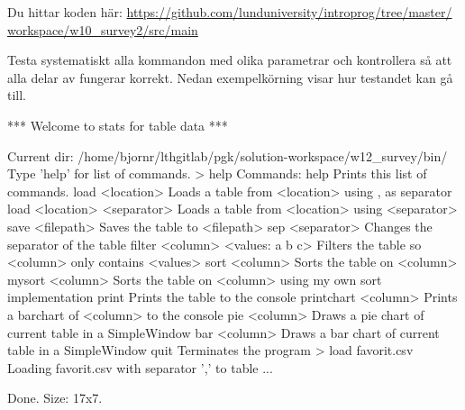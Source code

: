 \noindent Du hittar koden här:
\href{https://github.com/lunduniversity/introprog/tree/master/workspace/w12_survey2/src/main}{https://github.com/lunduniversity/introprog/tree/master/\\workspace/w10\_survey2/src/main}




\Task Testa systematiskt alla kommandon med olika parametrar och kontrollera så att alla delar av  fungerar korrekt. Nedan exempelkörning visar hur testandet kan gå till.

\begin{REPLnonum}
*** Welcome to stats for table data ***

Current dir: /home/bjornr/lthgitlab/pgk/solution-workspace/w12_survey/bin/
Type 'help' for list of commands.
> help
Commands: help
             Prints this list of commands.
          load <location>
             Loads a table from <location> using , as separator
          load <location> <separator>
             Loads a table from <location> using <separator>
          save <filepath>
             Saves the table to <filepath>
          sep <separator>
             Changes the separator of the table
          filter <column> <values: a b c>
             Filters the table so <column> only contains <values>
          sort <column>
             Sorts the table on <column>
          mysort <column>
             Sorts the table on <column> using my own sort implementation
          print
             Prints the table to the console
          printchart <column>
             Prints a barchart of <column> to the console
          pie <column>
             Draws a pie chart of current table in a SimpleWindow
          bar <column>
             Draws a bar chart of current table in a SimpleWindow
          quit
             Terminates the program
> load favorit.csv
Loading favorit.csv with separator ',' to table ...

Done. Size: 17x7.


\end{REPLnonum}
